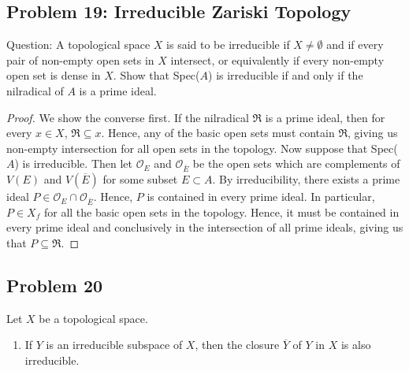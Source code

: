 \documentclass[12pt]{article}
\begin{document}
\subsection{Problem 19: Irreducible Zariski Topology}

Question: A topological space $X$ is said to be irreducible if $X \neq \emptyset$ and if every pair of non-empty open sets in $X$ intersect,
or equivalently if every non-empty open set is dense in $X$. Show that Spec($A$) is irreducible if and only if the nilradical of $A$ is a prime ideal. 

\begin{proof}
 We show the converse first. If the nilradical $\mathfrak{R}$ is a prime ideal, then for every $x \in X$, $\mathfrak{R} \subseteq x$. Hence, any of the basic open sets must contain $\mathfrak{R}$, giving us non-empty
 intersection for all open sets in the topology. Now suppose that Spec($A$) is irreducible. Then let $\mathcal{O}_E$ and $\mathcal{O}_{\bar{E}}$ be the open sets
 which are complements of $V(E)$ and $V(\overline{E})$ for some subset $E \subset A$. By irreducibility, there exists a prime ideal $P \in \mathcal{O}_E \cap \mathcal{O}_{\bar{E}}$. Hence, $P$ is contained in every prime ideal. In particular,
 $P \in X_f$ for all the basic open sets in the topology. Hence, it must be contained in every prime ideal and conclusively in the intersection of all prime ideals, giving us that $P \subseteq \mathfrak{R}$. \end{proof}

\subsection{Problem 20}

Let $X$ be a topological space.

\begin{enumerate}
 \item If $Y$ is an irreducible subspace of $X$, then the closure $\overline{Y}$
 of $Y$ in $X$ is also irreducible. 
 \end{enumerate}
\end{document}
